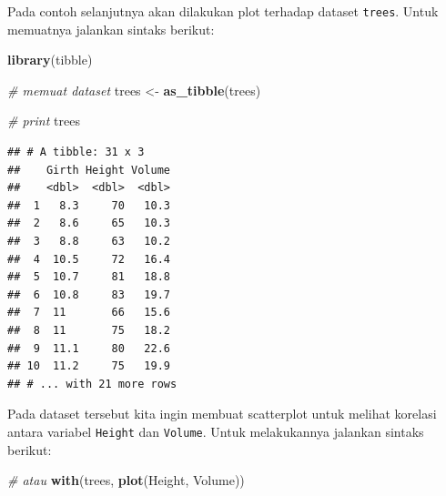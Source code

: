 \documentclass[]{book}
\newenvironment{Shaded}{\begin{snugshade}}{\end{snugshade}}
\newcommand{\KeywordTok}[1]{\textcolor[rgb]{0.13,0.29,0.53}{\textbf{#1}}}
\newcommand{\StringTok}[1]{\textcolor[rgb]{0.31,0.60,0.02}{#1}}
\newcommand{\CommentTok}[1]{\textcolor[rgb]{0.56,0.35,0.01}{\textit{#1}}}
\newcommand{\OperatorTok}[1]{\textcolor[rgb]{0.81,0.36,0.00}{\textbf{#1}}}
\newcommand{\NormalTok}[1]{#1}
\begin{document}
Pada contoh selanjutnya akan dilakukan plot terhadap dataset
\texttt{trees}. Untuk memuatnya jalankan sintaks berikut:

\begin{Shaded}
\begin{Highlighting}[]
\KeywordTok{library}\NormalTok{(tibble)}
\end{Highlighting}
\end{Shaded}

\begin{Shaded}
\begin{Highlighting}[]
\CommentTok{# memuat dataset}
\NormalTok{trees <-}\StringTok{ }\KeywordTok{as_tibble}\NormalTok{(trees)}

\CommentTok{# print }
\NormalTok{trees}
\end{Highlighting}
\end{Shaded}

\begin{verbatim}
## # A tibble: 31 x 3
##    Girth Height Volume
##    <dbl>  <dbl>  <dbl>
##  1   8.3     70   10.3
##  2   8.6     65   10.3
##  3   8.8     63   10.2
##  4  10.5     72   16.4
##  5  10.7     81   18.8
##  6  10.8     83   19.7
##  7  11       66   15.6
##  8  11       75   18.2
##  9  11.1     80   22.6
## 10  11.2     75   19.9
## # ... with 21 more rows
\end{verbatim}

Pada dataset tersebut kita ingin membuat scatterplot untuk melihat
korelasi antara variabel \texttt{Height} dan \texttt{Volume}. Untuk
melakukannya jalankan sintaks berikut:

\begin{Shaded}
\end{Shaded}

\begin{Shaded}
\begin{Highlighting}[]
\CommentTok{# atau }
\KeywordTok{with}\NormalTok{(trees, }\KeywordTok{plot}\NormalTok{(Height, Volume))}
\end{Highlighting}
\end{Shaded}
\end{document}
